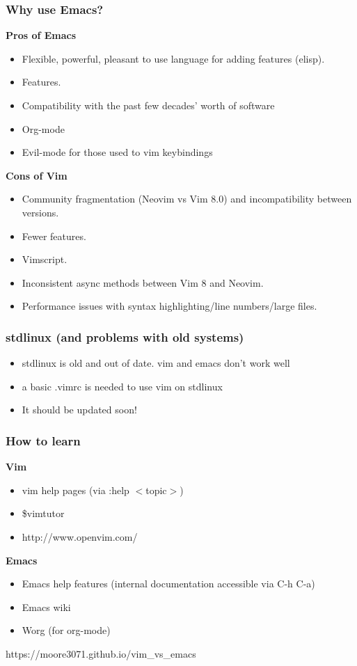 \documentclass[8pt]{beamer}
\begin{document}
\begin{frame}
  \frametitle{Why use Emacs?}
  \begin{multicols}{2}
    \textbf{Pros of Emacs}
    \begin{itemize}
      \item Flexible, powerful, pleasant to use language for adding
        features (elisp).
      \item Features.
      \item Compatibility with the past few decades' worth of software
      \item Org-mode
      \item Evil-mode for those used to vim keybindings
    \end{itemize}
    \columnbreak
    \textbf{Cons of Vim}
    \begin{itemize}
      \item Community fragmentation (Neovim vs Vim 8.0) and
        incompatibility between versions.
      \item Fewer features.
      \item Vimscript.
      \item Inconsistent async methods between Vim 8 and Neovim.
      \item Performance issues with syntax highlighting/line
        numbers/large files.
    \end{itemize}
  \end{multicols}
\end{frame}

\begin{frame}
  \frametitle{stdlinux (and problems with old systems)}
        \begin{itemize}
          \item stdlinux is old and out of date. vim and emacs don't work well
          \item a basic .vimrc is needed to use vim on stdlinux
          \item It should be updated soon!
        \end{itemize}
\end{frame}

\begin{frame}
  \frametitle{How to learn}
  \textbf{Vim}
  \begin{itemize}
    \item vim help pages (via :help $<$topic$>$)
    \item \$vimtutor
    \item http://www.openvim.com/
  \end{itemize}
  \textbf{Emacs}
  \begin{itemize}
    \item Emacs help features (internal documentation accessible via C-h C-a)
    \item Emacs wiki
    \item Worg (for org-mode)
  \end{itemize}
\end{frame}

\begin{frame}
  \Huge{https://moore3071.github.io/vim\_vs\_emacs}
\end{frame}
\end{document}
